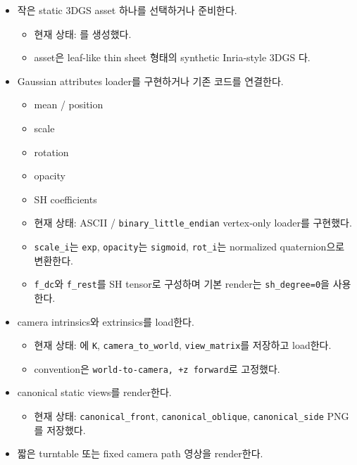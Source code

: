 \documentclass[10pt]{article}
\newcommand{\done}{\textcolor{DoneGreen}{\(\boxtimes\)}}
\newcommand{\code}[1]{\texttt{#1}}
\begin{document}
\begin{itemize}
  \item[\done] 작은 static 3DGS asset 하나를 선택하거나 준비한다.
    \begin{itemize}
      \item 현재 상태: 를 생성했다.
      \item asset은 leaf-like thin sheet 형태의 synthetic Inria-style 3DGS 다.
    \end{itemize}
  \item[\done] Gaussian attributes loader를 구현하거나 기존 코드를 연결한다.
    \begin{itemize}
      \item mean / position
      \item scale
      \item rotation
      \item opacity
      \item SH coefficients
      \item 현재 상태: ASCII / \code{binary\_little\_endian} vertex-only  loader를 구현했다.
      \item \code{scale\_i}는 \code{exp}, \code{opacity}는 \code{sigmoid}, \code{rot\_i}는 normalized quaternion으로 변환한다.
      \item \code{f\_dc}와 \code{f\_rest}를 SH tensor로 구성하며 기본 render는 \code{sh\_degree=0}을 사용한다.
    \end{itemize}
  \item[\done] camera intrinsics와 extrinsics를 load한다.
    \begin{itemize}
      \item 현재 상태: 에 \code{K}, \code{camera\_to\_world}, \code{view\_matrix}를 저장하고 load한다.
      \item convention은 \code{world-to-camera, +z forward}로 고정했다.
    \end{itemize}
  \item[\done] canonical static views를 render한다.
    \begin{itemize}
      \item 현재 상태: \code{canonical\_front}, \code{canonical\_oblique}, \code{canonical\_side} PNG를 저장했다.
    \end{itemize}
  \item[\done] 짧은 turntable 또는 fixed camera path 영상을 render한다.
    \begin{itemize}

\end{itemize}
\end{itemize}
\end{document}
